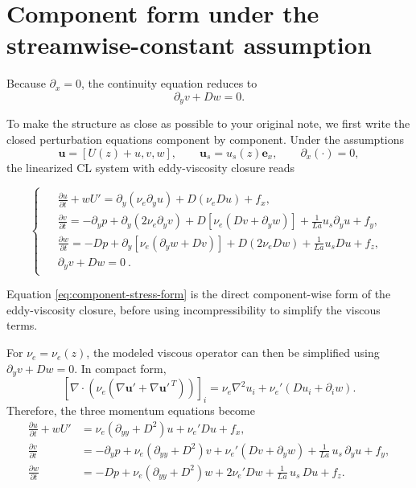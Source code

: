 \documentclass[11pt]{article}
\begin{document}
\section{Component form under the streamwise-constant assumption}

Because \(\partial_x=0\), the continuity equation reduces to
\begin{equation}
\partial_y v + D w = 0.
\label{eq:continuity-physical}
\end{equation}

To make the structure as close as possible to your original note, we first write the closed perturbation equations component by component. Under the assumptions
\[
\bm u = [U(z)+u,v,w],
\qquad
\bm u_s=u_s(z)\bm e_x,
\qquad
\partial_x(\cdot)=0,
\]
the linearized CL system with eddy-viscosity closure reads
\begin{linenomath*}
\begin{equation}
\begin{cases}
\begin{aligned}
&\frac{\partial u}{\partial t}+wU'
=
\partial_y\!\left(\nu_e\partial_y u\right)
+D\!\left(\nu_e D u\right)
+f_x,
\\[3pt]
&\frac{\partial v}{\partial t}
=
-\partial_y p
+\partial_y\!\left(2\nu_e\partial_y v\right)
+D\!\left[\nu_e\left(Dv+\partial_y w\right)\right]
+\frac{1}{La}u_s\partial_y u
+f_y,
\\[3pt]
&\frac{\partial w}{\partial t}
=
-Dp
+\partial_y\!\left[\nu_e\left(\partial_y w+Dv\right)\right]
+D\!\left(2\nu_e Dw\right)
+\frac{1}{La}u_sDu
+f_z,
\\[3pt]
&\partial_y v + Dw = 0
\ .
\end{aligned}
\end{cases}
\label{eq:component-stress-form}
\end{equation}
\end{linenomath*}

Equation \eqref{eq:component-stress-form} is the direct component-wise form of the eddy-viscosity closure, before using incompressibility to simplify the viscous terms.

For \(\nu_e=\nu_e(z)\), the modeled viscous operator can then be simplified using \(\partial_y v + Dw=0\). In compact form,
\[
\left[\nabla\cdot\left(
\nu_e(\nabla \bm u'+\nabla \bm u'^{\,T})
\right)\right]_i
=
\nu_e \nabla^2 u_i
+\nu_e' \left(Du_i+\partial_i w\right).
\]
Therefore, the three momentum equations become
\begin{subequations}
\begin{align}
\frac{\partial u}{\partial t} + w U'
&=
\nu_e\left(\partial_{yy}+D^2\right)u
+\nu_e' D u
+f_x,
\label{eq:u-physical}
\\
\frac{\partial v}{\partial t}
&=
-\partial_y p
+\nu_e\left(\partial_{yy}+D^2\right)v
+\nu_e'\left(Dv+\partial_y w\right)
+\frac{1}{La}\,u_s\,\partial_y u
+f_y,
\label{eq:v-physical}
\\
\frac{\partial w}{\partial t}
&=
-D p
+\nu_e\left(\partial_{yy}+D^2\right)w
+2\nu_e' D w
+\frac{1}{La}\,u_s\,D u
+f_z.
\label{eq:w-physical}
\end{align}
\end{subequations}
\end{document}
